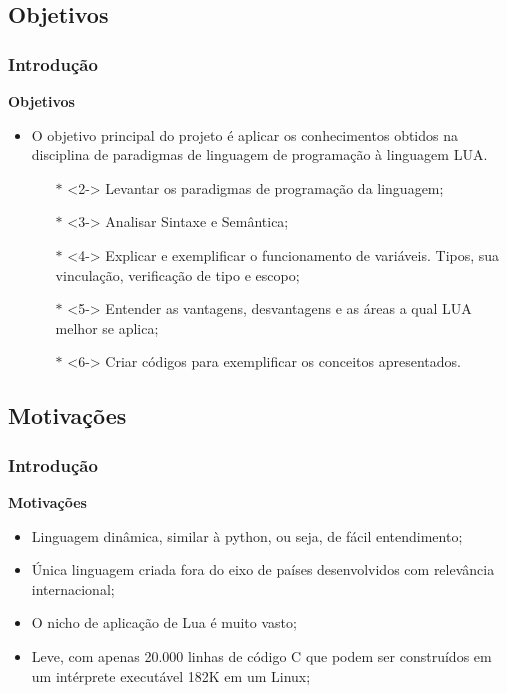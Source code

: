 \documentclass{beamer}
\begin{document}
\subsection{Objetivos}
\begin{frame}[fragile]
	\frametitle{Introdução}
	{\bf Objetivos}\vspace{0.4cm}
	\begin{itemize}
		\item<1-> O objetivo principal do projeto é aplicar os conhecimentos obtidos na disciplina de paradigmas de linguagem de programação à linguagem LUA.
		\begin{itemize}
			\item[$\mathbb{*}$]<2-> Levantar os paradigmas de programação da linguagem;
			\item[$\mathbb{*}$]<3-> Analisar Sintaxe e Semântica;
			\item[$\mathbb{*}$]<4-> Explicar e exemplificar o funcionamento de variáveis. Tipos, sua vinculação, verificação de tipo e escopo;
			\item[$\mathbb{*}$]<5-> Entender as vantagens, desvantagens e as áreas a qual LUA melhor se aplica;
			\item[$\mathbb{*}$]<6-> Criar códigos para exemplificar os conceitos apresentados. 
		\end{itemize}
	\end{itemize}
\end{frame}

\subsection{Motivações}
\begin{frame}[fragile]
	\frametitle{Introdução}
	{\bf Motivações}\vspace{0.4cm}
	\begin{itemize}
		\item <1-> Linguagem dinâmica, similar à python, ou seja, de fácil entendimento;
		\item <2-> Única linguagem criada fora do eixo de países desenvolvidos com relevância internacional;
		\item <3-> O nicho de aplicação de Lua é muito vasto;
		\item <4-> Leve, com apenas 20.000 linhas de código C que podem ser construídos em um intérprete executável 182K em um Linux;
	\end{itemize}
\end{frame}
\end{document}
